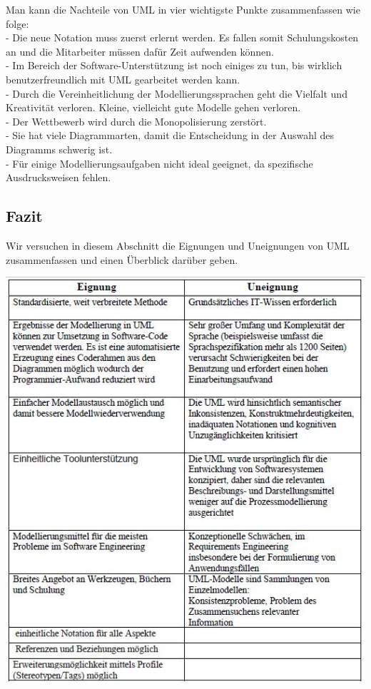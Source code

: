 Man kann die Nachteile von UML in vier wichtigste Punkte zusammenfassen wie folge:\\
- Die neue Notation muss zuerst erlernt werden. Es fallen somit Schulungskosten an
und die Mitarbeiter müssen dafür Zeit aufwenden können\cite{MT016}.\\
- Im Bereich der Software-Unterstützung ist noch einiges zu tun, bis wirklich
benutzerfreundlich mit UML gearbeitet werden kann\cite{MT016}.\\
- Durch die Vereinheitlichung der Modellierungssprachen geht die Vielfalt und
Kreativität verloren. Kleine, vielleicht gute Modelle gehen verloren\cite{MT016}.\\
- Der Wettbewerb wird durch die Monopolisierung zerstört\cite{MT016}.\\
- Sie hat viele Diagrammarten, damit die Entscheidung in der Auswahl des Diagramms schwerig ist.\\
- Für einige Modellierungsaufgaben nicht ideal geeignet, da spezifische Ausdrucksweisen fehlen.
\subsection{Fazit}

Wir versuchen in diesem Abschnitt die Eignungen und Uneignungen von UML zusammenfassen und einen Überblick darüber geben.


		
		\includegraphics[scale=1]{Graphics/vornachteil.jpg} 
		
		
		
